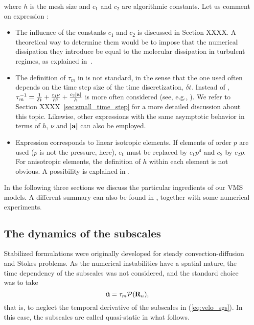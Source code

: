 where $h$ is the mesh size and $c_1$ and $c_2$ are algorithmic constants. Let us comment on expression :
\begin{itemize}
\item The influence of the constants $c_1$ and $c_2$ is discussed in Section XXXX. A theoretical way to determine them would be to impose that the numerical dissipation they introduce be equal to the molecular dissipation in turbulent regimes, as explained in~\cite{guasch-codina-13}. 
\item The definition of $\tau_m$ in  is not standard, in the sense that the one used often depends on the time step size of the time discretization, $\delta t$. Instead of , $\tau_m^{-1}=\frac{1}{\delta t} + \frac{c_1\nu}{h^2}+\frac{c_2|{\bf a}|}{h}$ is more often considered (see, e.g., \cite{Hsu2010,gamnitzer_time-dependent_2010}). We refer to 
Section XXXX~\ref{sec:small_time_step} for a more detailed discussion about this topic. Likewise, other expressions with the same asymptotic behavior in terms of $h$, $\nu$ and $|{\bf a}|$ can also be employed.
\item Expression  corresponds to linear isotropic elements. If elements of order $p$ are used ($p$ is not the pressure, here), $c_1$ must be replaced by $c_1 p^4$ and $c_2$ by $c_2 p$. For anisotropic elements, the definition of $h$ within each element is not obvious. A possibility is explained in \cite{Principe2010}.
\end{itemize}

In the following three sections we discuss the particular ingredients of our VMS models. A different summary can also be found in \cite{Codina-chap-2011}, together with some numerical experiments. 

\subsection{The dynamics of the subscales}
\label{subsec-C2_vms_dyn}
Stabilized formulations were originally developed for steady convection-diffusion \cite{Brooks_1982} and Stokes \cite{Douglas_1989,Hughes_1986_5} problems. As the numerical instabilities have a spatial nature, the time dependency of the subscales was not considered, and the standard choice \cite{Hughes2000,hughes_large_2001,bazilevs_variational_2007} was to take 
\begin{equation}
\label{eq-C2_vms_static_sgs}
\tilde{{\bf u}}=\tau_m \mathcal{P}({\bf R}_u),
\end{equation}
that is, to neglect the temporal derivative of the subscales in (\ref{eq:velo_sgs}). In this case, the subscales are called quasi-static in what follows.

